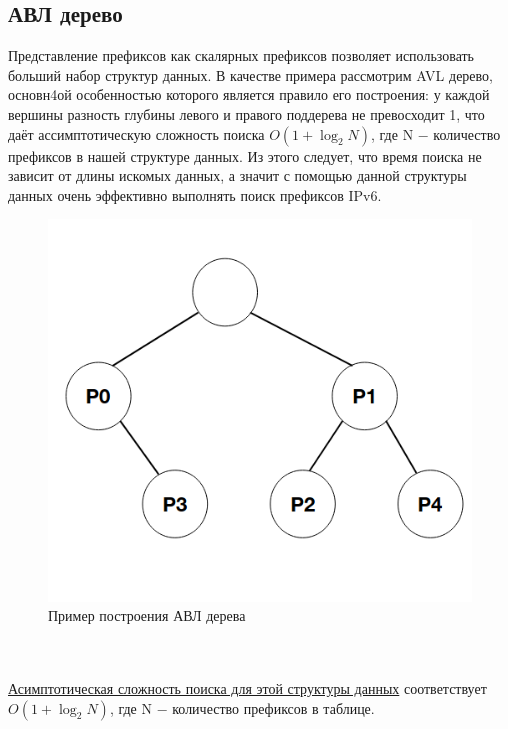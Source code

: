 \documentclass[a4peper, 12pt, titlepage, finall]{report}
\begin{document}
        \subsection{АВЛ дерево}
            Представление префиксов как скалярных префиксов позволяет использовать больший набор структур данных. 
            В качестве примера рассмотрим AVL дерево, основн4ой особенностью которого является правило его построения: у каждой вершины разность 
            глубины левого и правого поддерева не превосходит 1, что даёт ассимптотическую сложность поиска {\ttfamily $O(1+\log_2{N})$}, 
            где {\ttfamily N} $-$ количество префиксов в нашей структуре данных. Из этого следует, что время поиска не зависит от длины искомых данных,
            а значит с помощью данной структуры данных очень эффективно выполнять поиск префиксов IPv6.
            \\
            \begin{figure}[h]
                \includegraphics[width=\textwidth]{AVL-tree.png}
                \caption{Пример построения АВЛ дерева}\label{fig:mesh5}
            \end{figure}
            \\
            \\
            \underline{Асимптотическая сложность поиска для этой структуры данных} соответствует {\ttfamily $O(1 + \log_2{N})$},
            где {\ttfamily N} $-$ количество префиксов в таблице.\\
\end{document}
